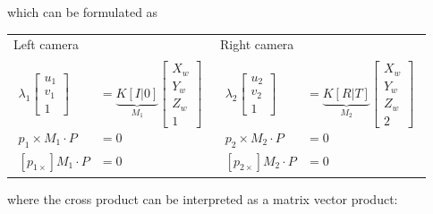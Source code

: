\documentclass[10pt,a4paper]{scrartcl}
\begin{document}
\begin{multicols*}{2}
\vspace{3ex}

which can be formulated as 

\vspace{3ex}

\begin{center}
\begin{tabular}{l|l}
Left camera&Right camera\\
$\begin{aligned}
\lambda_1\begin{bmatrix}
u_1\\v_1\\1
\end{bmatrix}&=\underbrace{K[I|0]}_{M_1}\begin{bmatrix}
X_w\\Y_w\\Z_w\\1
\end{bmatrix}\\
p_1\times M_1\cdot P &= 0\\
\left[p_{1\times}\right]M_1\cdot P &= 0
\end{aligned}$
&
$\begin{aligned}
\lambda_2\begin{bmatrix}
u_2\\v_2\\1
\end{bmatrix}&=\underbrace{K[R|T]}_{M_2}\begin{bmatrix}
X_w\\Y_w\\Z_w\\2
\end{bmatrix}\\
p_2\times M_2\cdot P &= 0\\
\left[p_{2\times}\right]M_2\cdot P&=0
\end{aligned}$
\end{tabular}
\end{center}

where the cross product can be interpreted as a matrix vector product:



\end{multicols*}
\end{document}
